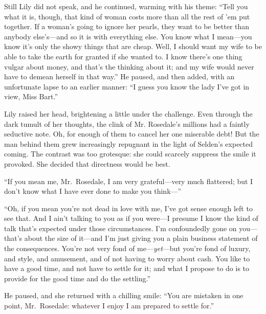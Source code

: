 \documentclass[12pt,a4paper]{book}
\begin{document}
Still Lily did not speak, and he continued, warming with his
theme: ``Tell you what it is, though, that kind of woman costs
more than all the rest of 'em put together. If a woman's
going to ignore her pearls, they want to be better than anybody
else's---and so it is with everything else. You know what I
mean---you know it's only the showy things that are cheap. Well, I
should want my wife to be able to take the earth for granted if
she wanted to. I know there's one thing vulgar about money, and
that's the thinking about it; and my wife would never have to
demean herself in that way.'' He paused, and then added, with an
unfortunate lapse to an earlier manner: ``I guess you know the
lady I've got in view, Miss Bart.''





Lily raised her head, brightening a little under the challenge. 
Even through the dark tumult of her thoughts, the clink of Mr.
Rosedale's millions had a faintly seductive note. Oh, for enough
of them to cancel her one miserable debt! But the man behind them
grew increasingly repugnant in the light of Selden's expected
coming. The contrast was too grotesque: she could scarcely
suppress the smile it provoked. She decided that directness would
be best.





``If you mean me, Mr.\ Rosedale, I am very grateful---very much
flattered; but I don't know what I have ever done to make you
think---''





``Oh, if you mean you're not dead in love with me, I've got sense
enough left to see that. And I ain't talking to you as if you
were---I presume I know the kind of talk that's expected under
those circumstances. I'm confoundedly gone on you---that's about
the size of it---and I'm just giving you a plain business
statement of the consequences. You're not very fond of
me---\textit{yet}---but you're fond of luxury, and style, and amusement, and
of not having to worry about cash. You like to have a good time,
and not have to settle for it; and what I propose to do is to
provide for the good time and do the settling.''





He paused, and she returned with a chilling smile: ``You are
mistaken in one point, Mr.\ Rosedale: whatever I enjoy I am
prepared to settle for.''
\end{document}
